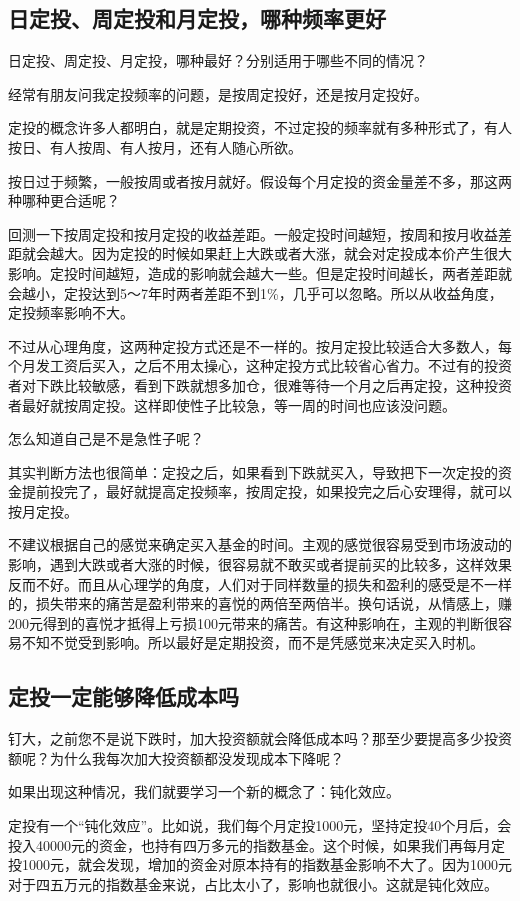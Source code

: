 \subsection{日定投、周定投和月定投，哪种频率更好}
{\kaishu 日定投、周定投、月定投，哪种最好？分别适用于哪些不同的情况？}

经常有朋友问我定投频率的问题，是按周定投好，还是按月定投好。

定投的概念许多人都明白，就是定期投资，不过定投的频率就有多种形式了，有人按日、有人按周、有人按月，还有人随心所欲。

按日过于频繁，一般按周或者按月就好。假设每个月定投的资金量差不多，那这两种哪种更合适呢？

回测一下按周定投和按月定投的收益差距。一般定投时间越短，按周和按月收益差距就会越大。因为定投的时候如果赶上大跌或者大涨，就会对定投成本价产生很大影响。定投时间越短，造成的影响就会越大一些。但是定投时间越长，两者差距就会越小，定投达到5～7年时两者差距不到1\%，几乎可以忽略。所以从收益角度，定投频率影响不大。

不过从心理角度，这两种定投方式还是不一样的。按月定投比较适合大多数人，每个月发工资后买入，之后不用太操心，这种定投方式比较省心省力。不过有的投资者对下跌比较敏感，看到下跌就想多加仓，很难等待一个月之后再定投，这种投资者最好就按周定投。这样即使性子比较急，等一周的时间也应该没问题。

怎么知道自己是不是急性子呢？

其实判断方法也很简单：定投之后，如果看到下跌就买入，导致把下一次定投的资金提前投完了，最好就提高定投频率，按周定投，如果投完之后心安理得，就可以按月定投。

不建议根据自己的感觉来确定买入基金的时间。主观的感觉很容易受到市场波动的影响，遇到大跌或者大涨的时候，很容易就不敢买或者提前买的比较多，这样效果反而不好。而且从心理学的角度，人们对于同样数量的损失和盈利的感受是不一样的，损失带来的痛苦是盈利带来的喜悦的两倍至两倍半。换句话说，从情感上，赚200元得到的喜悦才抵得上亏损100元带来的痛苦。有这种影响在，主观的判断很容易不知不觉受到影响。所以最好是定期投资，而不是凭感觉来决定买入时机。

\subsection{定投一定能够降低成本吗}
{\kaishu 钉大，之前您不是说下跌时，加大投资额就会降低成本吗？那至少要提高多少投资额呢？为什么我每次加大投资额都没发现成本下降呢？}

如果出现这种情况，我们就要学习一个新的概念了：钝化效应。

定投有一个“钝化效应”。比如说，我们每个月定投1000元，坚持定投40个月后，会投入40000元的资金，也持有四万多元的指数基金。这个时候，如果我们再每月定投1000元，就会发现，增加的资金对原本持有的指数基金影响不大了。因为1000元对于四五万元的指数基金来说，占比太小了，影响也就很小。这就是钝化效应。

